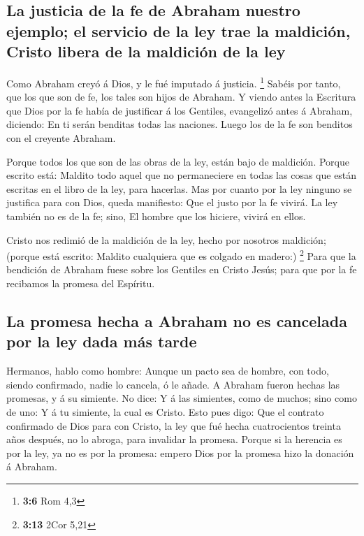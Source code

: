\hypertarget{la-justicia-de-la-fe-de-abraham-nuestro-ejemplo-el-servicio-de-la-ley-trae-la-maldiciuxf3n-cristo-libera-de-la-maldiciuxf3n-de-la-ley}{%
\subsection{La justicia de la fe de Abraham nuestro ejemplo; el servicio
de la ley trae la maldición, Cristo libera de la maldición de la
ley}\label{la-justicia-de-la-fe-de-abraham-nuestro-ejemplo-el-servicio-de-la-ley-trae-la-maldiciuxf3n-cristo-libera-de-la-maldiciuxf3n-de-la-ley}}

 Como Abraham creyó á Dios, y le fué imputado á justicia.
\footnote{\textbf{3:6} Rom 4,3}  Sabéis por tanto, que los
que son de fe, los tales son hijos de Abraham.  Y viendo
antes la Escritura que Dios por la fe había de justificar á los
Gentiles, evangelizó antes á Abraham, diciendo: En ti serán benditas
todas las naciones.  Luego los de la fe son benditos con
el creyente Abraham.

 Porque todos los que son de las obras de la ley, están
bajo de maldición. Porque escrito está: Maldito todo aquel que no
permaneciere en todas las cosas que están escritas en el libro de la
ley, para hacerlas.  Mas por cuanto por la ley ninguno se
justifica para con Dios, queda manifiesto: Que el justo por la fe
vivirá.  La ley también no es de la fe; sino, El hombre
que los hiciere, vivirá en ellos.

 Cristo nos redimió de la maldición de la ley, hecho por
nosotros maldición; (porque está escrito: Maldito cualquiera que es
colgado en madero:) \footnote{\textbf{3:13} 2Cor 5,21} 
Para que la bendición de Abraham fuese sobre los Gentiles en Cristo
Jesús; para que por la fe recibamos la promesa del Espíritu.

\hypertarget{la-promesa-hecha-a-abraham-no-es-cancelada-por-la-ley-dada-muxe1s-tarde}{%
\subsection{La promesa hecha a Abraham no es cancelada por la ley dada
más
tarde}\label{la-promesa-hecha-a-abraham-no-es-cancelada-por-la-ley-dada-muxe1s-tarde}}

 Hermanos, hablo como hombre: Aunque un pacto sea de
hombre, con todo, siendo confirmado, nadie lo cancela, ó le añade.
 A Abraham fueron hechas las promesas, y á su simiente.
No dice: Y á las simientes, como de muchos; sino como de uno: Y á tu
simiente, la cual es Cristo.  Esto pues digo: Que el
contrato confirmado de Dios para con Cristo, la ley que fué hecha
cuatrocientos treinta años después, no lo abroga, para invalidar la
promesa.  Porque si la herencia es por la ley, ya no es
por la promesa: empero Dios por la promesa hizo la donación á Abraham.

